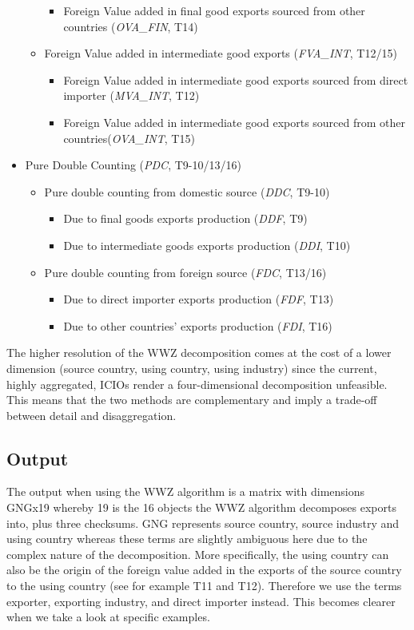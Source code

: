\documentclass{article}
\begin{document}
\begin{itemize}
\begin{itemize}
\begin{itemize}
\item Foreign Value added in final good exports sourced from other countries (\textit{OVA_FIN}, T14)
\end{itemize}
\item Foreign Value added in intermediate good exports (\textit{FVA_INT}, T12/15)
\begin{itemize}
\item Foreign Value added in intermediate good exports sourced from direct importer (\textit{MVA_INT}, T12)
\item Foreign Value added in intermediate good exports sourced from other countries(\textit{OVA_INT}, T15)
\end{itemize}
\end{itemize}
\item Pure Double Counting (\textit{PDC}, T9-10/13/16)
\begin{itemize}
\item Pure double counting from domestic source (\textit{DDC}, T9-10)
\begin{itemize}
\item Due to final goods exports production (\textit{DDF}, T9)
\item Due to intermediate goods exports production (\textit{DDI}, T10)
\end{itemize}
\item Pure double counting from foreign source (\textit{FDC}, T13/16)
\begin{itemize}
\item Due to direct importer exports production (\textit{FDF}, T13)
\item Due to other countries' exports production (\textit{FDI}, T16)
\end{itemize}
\end{itemize}
\end{itemize}
The higher resolution of the WWZ decomposition comes at the cost of a lower dimension (source country, using country, using industry) since the current, highly aggregated, ICIOs render a four-dimensional decomposition unfeasible. This means that the two methods are complementary and imply a trade-off between detail and disaggregation.

\subsection{Output}
The output when using the WWZ algorithm is a matrix with dimensions GNGx19 whereby 19 is the 16 objects the WWZ algorithm decomposes exports into, plus three checksums. GNG represents source country, source industry and using country whereas these terms are slightly ambiguous here due to the complex nature of the decomposition. More specifically, the using country can also be the origin of the foreign value added in the exports of the source country to the using country (see for example T11 and T12). Therefore we use the terms exporter, exporting industry, and direct importer instead. This becomes clearer when we take a look at specific examples.\\
\end{document}
